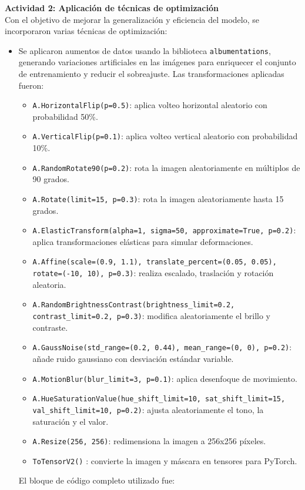 \textbf{Actividad 2: Aplicación de técnicas de optimización} \\
Con el objetivo de mejorar la generalización y eficiencia del modelo, se incorporaron varias técnicas de optimización:
\begin{itemize}
\item Se aplicaron aumentos de datos usando la biblioteca \texttt{albumentations}, generando variaciones artificiales en las imágenes para enriquecer el conjunto de entrenamiento y reducir el sobreajuste. Las transformaciones aplicadas fueron:
  \begin{itemize}
  \item \texttt{A.HorizontalFlip(p=0.5)}: aplica volteo horizontal aleatorio con probabilidad 50\%.
  \item \texttt{A.VerticalFlip(p=0.1)}: aplica volteo vertical aleatorio con probabilidad 10\%.
  \item \texttt{A.RandomRotate90(p=0.2)}: rota la imagen aleatoriamente en múltiplos de 90 grados.
  \item \texttt{A.Rotate(limit=15, p=0.3)}: rota la imagen aleatoriamente hasta 15 grados.
  \item \texttt{A.ElasticTransform(alpha=1, sigma=50, approximate=True, p=0.2)}: aplica transformaciones elásticas para simular deformaciones.
  \item \texttt{A.Affine(scale=(0.9, 1.1), translate\_percent=(0.05, 0.05), rotate=(-10, 10), p=0.3)}: realiza escalado, traslación y rotación aleatoria.
  \item \texttt{A.RandomBrightnessContrast(brightness\_limit=0.2, contrast\_limit=0.2, p=0.3)}: modifica aleatoriamente el brillo y contraste.
  \item \texttt{A.GaussNoise(std\_range=(0.2, 0.44), mean\_range=(0, 0), p=0.2)}: añade ruido gaussiano con desviación estándar variable.
  \item \texttt{A.MotionBlur(blur\_limit=3, p=0.1)}: aplica desenfoque de movimiento.
  \item \texttt{A.HueSaturationValue(hue\_shift\_limit=10, sat\_shift\_limit=15, val\_shift\_limit=10, p=0.2)}: ajusta aleatoriamente el tono, la saturación y el valor.
  \item \texttt{A.Resize(256, 256)}: redimensiona la imagen a 256x256 píxeles.
  \item \texttt{ToTensorV2()} : convierte la imagen y máscara en tensores para PyTorch.
  \end{itemize}
  El bloque de código completo utilizado fue:
  \begin{lstlisting}[language=Python]

\end{lstlisting}
\end{itemize}
